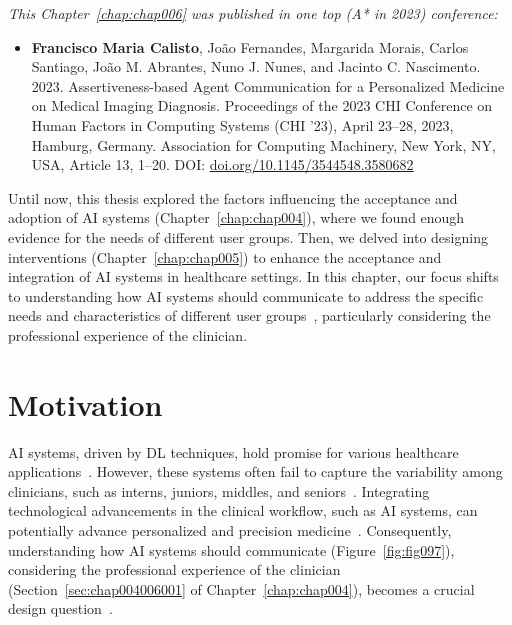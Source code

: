 \clearpage
\label{chap:chap006}

\noindent
{\it This Chapter~\ref{chap:chap006} was published in one top (A* in 2023) conference:}

\vspace{0.5mm}

\begin{itemize}
\item {\bf Francisco Maria Calisto}, Jo\~{a}o Fernandes, Margarida Morais, Carlos Santiago, Jo\~{a}o M. Abrantes, Nuno J. Nunes, and Jacinto C. Nascimento. 2023. Assertiveness-based Agent Communication for a Personalized Medicine on Medical Imaging Diagnosis. Proceedings of the 2023 CHI Conference on Human Factors in Computing Systems (CHI '23), April 23--28, 2023, Hamburg, Germany. Association for Computing Machinery, New York, NY, USA, Article 13, 1–20. DOI: \href{https://doi.org/10.1145/3544548.3580682}{doi.org/10.1145/3544548.3580682}
\end{itemize}

Until now, this thesis explored the factors influencing the acceptance and adoption of \ac{AI} systems (Chapter~\ref{chap:chap004}), where we found enough evidence for the needs of different user groups.
Then, we delved into designing interventions (Chapter~\ref{chap:chap005}) to enhance the acceptance and integration of \ac{AI} systems in healthcare settings.
In this chapter, our focus shifts to understanding how \ac{AI} systems should communicate to address the specific needs and characteristics of different user groups~\cite{10.1145/3544548.3580682}, particularly considering the professional experience of the clinician.

\section{Motivation}
\label{sec:chap006001}

\ac{AI} systems, driven by \ac{DL} techniques, hold promise for various healthcare applications~\cite{CALISTO2022102285, Hannun2019, Ruamviboonsuk2019}.
However, these systems often fail to capture the variability among clinicians, such as interns, juniors, middles, and seniors~\cite{Uddin2019}.
Integrating technological advancements in the clinical workflow, such as \ac{AI} systems, can potentially advance personalized and precision medicine~\cite{HO2020497, Wetzstein2020}.
Consequently, understanding how \ac{AI} systems should communicate (Figure~\ref{fig:fig097}), considering the professional experience of the clinician (Section~\ref{sec:chap004006001} of Chapter~\ref{chap:chap004}), becomes a crucial design question~\cite{pacheco2019alignment}.

